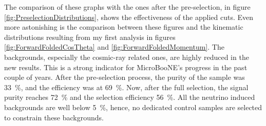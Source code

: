 The comparison of these graphs with the ones after the pre-selection, in figure \ref{fig:PreselectionDistributions}, shows the effectiveness of the applied cuts. Even more astonishing is the comparison between these figures and the kinematic distributions resulting from my first analysis in figures \ref{fig:ForwardFoldedCosTheta} and \ref{fig:ForwardFoldedMomentum}. The backgrounds, especially the cosmic-ray related ones, are highly reduced in the new results. This is a strong indicator for MicroBooNE's progress in the past couple of years. After the pre-selection process, the purity of the sample was \SI{33}{\percent}, and the efficiency was at \SI{69}{\percent}. Now, after the full selection, the signal purity reaches \SI{72}{\percent} and the selection efficiency \SI{56}{\percent}. All the neutrino induced backgrounds are well below \SI{5}{\percent}, hence, no dedicated control samples are selected to constrain these backgrounds.

